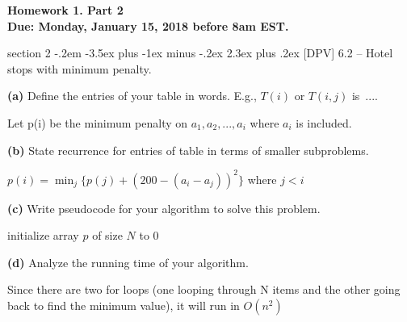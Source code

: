\documentclass{article}
\makeatletter
\newenvironment{problem}{\@startsection
       {section}
       {2}
       {-.2em}
       {-3.5ex plus -1ex minus -.2ex}
       {2.3ex plus .2ex}
       {\pagebreak[3]%
       \large\bf\noindent{Problem }
       }
       }
\makeatother
\begin{document}
{\bf \noindent Homework 1. Part 2 \\ Due: Monday, January 15, 2018 before 8am EST.}

\begin{problem}{[DPV] 6.2 -- Hotel stops with minimum penalty.}


{\bf (a) } Define the entries of your table in words.  E.g., $T(i)$ or $T(i,j)$ is~....

\vspace{.25in}
Let p(i) be the minimum penalty on $a_1, a_2, ... , a_i$ where $a_i$ is included. 

\vspace{3in}

{\bf (b) } State recurrence for entries of table in
terms of smaller subproblems.

\vspace{.25in}
$p(i) = \min_j \{p(j) + (200 - (a_i-a_j))^2\}$ where $j <  i$

\newpage

{\bf (c) }  Write pseudocode for your algorithm to solve this problem.

\begin{algorithm}
	\BlankLine
	
	initialize array $p$ of size $N$ to 0\;
\end{algorithm}

\vspace{2in}

{\bf (d) } Analyze the running time of your algorithm.

\vspace{.25in}
Since there are two for loops (one looping through N items and the other going back to find the minimum value), it will run in $O(n^2)$
 

\end{problem}

\newpage
\end{document}
